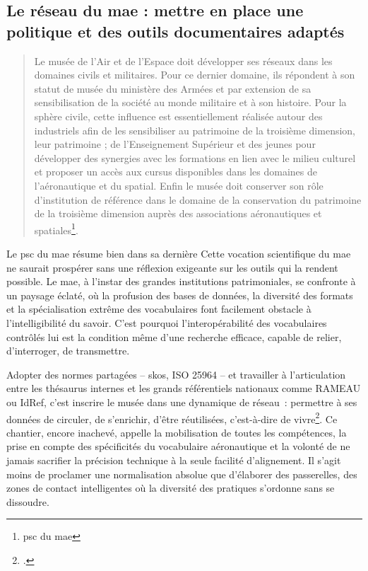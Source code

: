 \subsection{Le réseau du \ac{mae} : mettre en place une politique et des outils documentaires adaptés}

\begin{quote}
	\og Le musée de l’Air et de l’Espace doit développer ses réseaux \textelp{} dans les domaines civils et militaires. Pour ce dernier domaine, ils répondent à son statut de musée du ministère des Armées et par extension de sa sensibilisation de la société au monde militaire et à son histoire.
	Pour la sphère civile, cette influence est essentiellement réalisée autour des industriels afin de les sensibiliser au patrimoine de la troisième dimension, leur patrimoine ; de l’Enseignement Supérieur et des jeunes pour développer des synergies avec les formations en lien avec le milieu culturel et proposer un accès aux cursus disponibles dans les domaines de l’aéronautique et du spatial. Enfin \textelp{} le musée doit conserver son rôle d’institution de référence dans le domaine de la conservation du patrimoine de la troisième dimension auprès des associations aéronautiques et spatiales\footnote{\ac{psc} du \ac{mae}}.\fg
\end{quote}

Le \ac{psc} du \ac{mae} résume bien dans sa dernière
Cette vocation scientifique du \ac{mae} ne saurait prospérer sans une réflexion exigeante sur les outils qui la rendent possible. Le \ac{mae}, à l’instar des grandes institutions patrimoniales, se confronte à un paysage éclaté, où la profusion des bases de données, la diversité des formats et la spécialisation extrême des vocabulaires font facilement obstacle à l’intelligibilité du savoir. C’est pourquoi l’interopérabilité des vocabulaires contrôlés lui est la condition même d’une recherche efficace, capable de relier, d’interroger, de transmettre.

Adopter des normes partagées – \ac{skos}, ISO 25964 – et travailler à l’articulation entre les thésaurus internes et les grands référentiels nationaux comme RAMEAU ou IdRef, c’est inscrire le musée dans une dynamique de réseau : permettre à ses données de circuler, de s’enrichir, d’être réutilisées, c’est-à-dire de vivre\footcite{hudonISO25964Pour2012a,chichereau_normes_2007,nouvel_thesaurus_2019}. Ce chantier, encore inachevé, appelle la mobilisation de toutes les compétences, la prise en compte des spécificités du vocabulaire aéronautique et la volonté de ne jamais sacrifier la précision technique à la seule facilité d’alignement. Il s’agit moins de proclamer une normalisation absolue que d’élaborer des passerelles, des zones de contact intelligentes où la diversité des pratiques s’ordonne sans se dissoudre.

